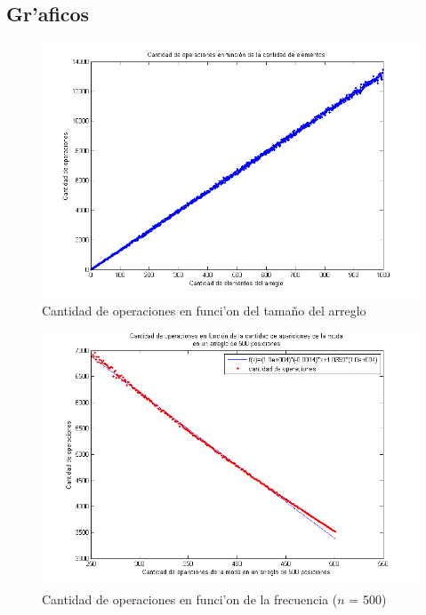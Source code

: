 \subsection{Gr'aficos}

\begin{figure}[H]
\centering
\includegraphics[scale=0.7]{../../codigo/ejercicio3/benchmark/graficos/corridas_aleatorias_n_creciente/grafico.png}
\caption{Cantidad de operaciones en funci'on del tama\~{n}o del arreglo}
\label{Ej3fig1}
\end{figure}

\begin{figure}[H]
\centering
\includegraphics[scale=0.7]{../../codigo/ejercicio3/benchmark/graficos/frecuencia/frecuencia.png}
\caption{Cantidad de operaciones en funci'on de la frecuencia ($n$ = 500)}
\label{Ej3fig2}
\end{figure}

